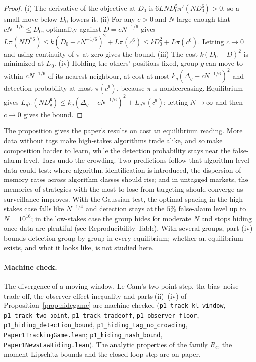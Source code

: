 \documentclass[12pt]{article}
\theoremstyle{definition}
\theoremstyle{remark}
\begin{document}
\begin{proof}
(i) The derivative of the objective at $D_0$ is $6LND_0^5\pi'(ND_0^6)>0$, so a small move below $D_0$ lowers it. (ii) For any $c>0$ and $N$ large enough that $cN^{-1/6}\le D_0$, optimality against $D=cN^{-1/6}$ gives $L\pi(ND^{*6})\le k(D_0-cN^{-1/6})^2+L\pi(c^6)\le kD_0^2+L\pi(c^6)$. Letting $c\to0$ and using continuity of $\pi$ at zero gives the bound. (iii) The cost $k(D_0-D)^2$ is minimized at $D_0$. (iv) Holding the others' positions fixed, group $g$ can move to within $cN^{-1/6}$ of its nearest neighbour, at cost at most $k_g(\Delta_g+cN^{-1/6})^2$ and detection probability at most $\pi(c^6)$, because $\pi$ is nondecreasing. Equilibrium gives $L_g\pi(ND_g^6)\le k_g(\Delta_g+cN^{-1/6})^2+L_g\pi(c^6)$; letting $N\to\infty$ and then $c\to0$ gives the bound.
\end{proof}

The proposition gives the paper's results on cost an equilibrium reading. More data without tags make high-stakes algorithms trade alike, and so make composition harder to learn, while the detection probability stays near the false-alarm level. Tags undo the crowding. Two predictions follow that algorithm-level data could test: where algorithm identification is introduced, the dispersion of memory rates across algorithm classes should rise; and in untagged markets, the memories of strategies with the most to lose from targeting should converge as surveillance improves. With the Gaussian test, the optimal spacing in the high-stakes case falls like $N^{-1/4}$ and detection stays at the $5\%$ false-alarm level up to $N=10^{16}$; in the low-stakes case the group hides for moderate $N$ and stops hiding once data are plentiful (see Reproducibility Table). With several groups, part (iv) bounds detection group by group in every equilibrium; whether an equilibrium exists, and what it looks like, is not studied here.

\paragraph{Machine check.} The divergence of a moving window, Le Cam's two-point step, the bias--noise trade-off, the observer-effect inequality and parts (ii)--(iv) of Proposition~\ref{prop:hidegame} are machine-checked (\texttt{p1\_track\_kl\_window}, \texttt{p1\_track\_two\_point}, \texttt{p1\_track\_tradeoff}, \texttt{p1\_observer\_floor}, \texttt{p1\_hiding\_detection\_bound}, \texttt{p1\_hiding\_tag\_no\_crowding}, \nolinkurl{Paper1TrackingGame.lean}; \texttt{p1\_hiding\_nash\_bound}, \nolinkurl{Paper1NewsLawHiding.lean}). The analytic properties of the family $R_c$, the moment Lipschitz bounds and the closed-loop step are on paper.
\end{document}
